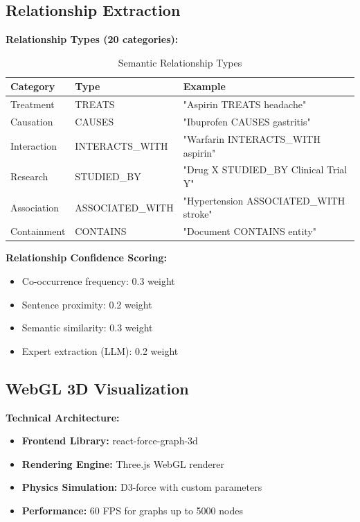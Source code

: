 \subsection{Relationship Extraction}

\textbf{Relationship Types (20 categories):}

\begin{table}[h]
\centering
\caption{Semantic Relationship Types}
\begin{tabularx}{\textwidth}{llX}
\toprule
\textbf{Category} & \textbf{Type} & \textbf{Example} \\
\midrule
Treatment & TREATS & "Aspirin TREATS headache" \\
Causation & CAUSES & "Ibuprofen CAUSES gastritis" \\
Interaction & INTERACTS\_WITH & "Warfarin INTERACTS\_WITH aspirin" \\
Research & STUDIED\_BY & "Drug X STUDIED\_BY Clinical Trial Y" \\
Association & ASSOCIATED\_WITH & "Hypertension ASSOCIATED\_WITH stroke" \\
Containment & CONTAINS & "Document CONTAINS entity" \\
\bottomrule
\end{tabularx}
\end{table}

\textbf{Relationship Confidence Scoring:}
\begin{itemize}
    \item Co-occurrence frequency: 0.3 weight
    \item Sentence proximity: 0.2 weight
    \item Semantic similarity: 0.3 weight
    \item Expert extraction (LLM): 0.2 weight
\end{itemize}

\subsection{WebGL 3D Visualization}

\textbf{Technical Architecture:}
\begin{itemize}
    \item \textbf{Frontend Library:} react-force-graph-3d
    \item \textbf{Rendering Engine:} Three.js WebGL renderer
    \item \textbf{Physics Simulation:} D3-force with custom parameters
    \item \textbf{Performance:} 60 FPS for graphs up to 5000 nodes
\end{itemize}

